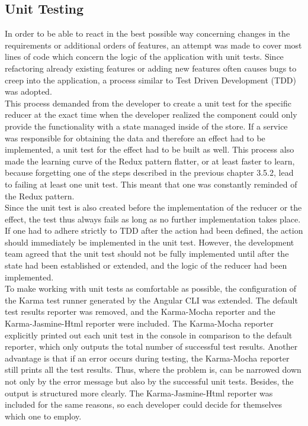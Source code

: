 \documentclass[Bachelor,BIF,english]{twbook}
\begin{document}
\subsection{Unit Testing}
In order to be able to react in the best possible way concerning changes in the requirements or additional orders of features, an attempt was made to cover most lines of code which concern the logic of the application with unit tests. Since refactoring already existing features or adding new features often causes bugs to creep into the application, a process similar to Test Driven Development (TDD) \cite{TDD} was adopted.
\\[\baselineskip]
This process demanded from the developer to create a unit test for the specific reducer at the exact time when the developer realized the component could only provide the functionality with a state managed inside of the store. If a service was responsible for obtaining the data and therefore an effect had to be implemented, a unit test for the effect had to be built as well. This process also made the learning curve of the Redux pattern flatter, or at least faster to learn, because forgetting one of the steps described in the previous chapter 3.5.2, lead to failing at least one unit test. This meant that one was constantly reminded of the Redux pattern. 
\\[\baselineskip]
Since the unit test is also created before the implementation of the reducer or the effect, the test thus always fails as long as no further implementation takes place. If one had to adhere strictly to TDD after the action had been defined, the action should immediately be implemented in the unit test. However,  the development team agreed that the unit test should not be fully implemented until after the state had been established or extended, and the logic of the reducer had been implemented.
\\[\baselineskip]
To make working with unit tests as comfortable as possible, the configuration of the Karma test runner \cite{Karma} generated by the Angular CLI was extended. The default test results reporter was removed, and the Karma-Mocha reporter \cite{KarmaMocha} and the Karma-Jasmine-Html \cite{KarmaJasmineHTML} reporter were included. The Karma-Mocha reporter explicitly printed out each unit test in the console in comparison to the default reporter, which only outputs the total number of successful test results. Another advantage is that if an error occurs during testing, the Karma-Mocha reporter still prints all the test results. Thus, where the problem is, can be narrowed down not only by the error message but also by the successful unit tests. Besides, the output is structured more clearly. The Karma-Jasmine-Html reporter was included for the same reasons, so each developer could decide for themselves which one to employ.
\end{document}
